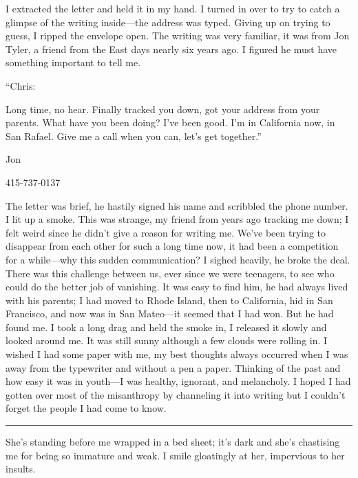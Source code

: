 I extracted the letter and held it in my hand. I turned in over to try
to catch a glimpse of the writing inside---the address was typed. Giving
up on trying to guess, I ripped the envelope open. The writing was very
familiar, it was from Jon Tyler, a friend from the East days nearly six
years ago. I figured he must have something important to tell me.

``Chris:

Long time, no hear. Finally tracked you down, got your address from your
parents. What have you been doing? I've been good. I'm in California
now, in San Rafael. Give me a call when you can, let's get together.''

Jon

415-737-0137

The letter was brief, he hastily signed his name and scribbled the phone
number. I lit up a smoke. This was strange, my friend from years ago
tracking me down; I felt weird since he didn't give a reason for writing
me. We've been trying to disappear from each other for such a long time
now, it had been a competition for a while---why this sudden
communication? I sighed heavily, he broke the deal. There was this
challenge between us, ever since we were teenagers, to see who could do
the better job of vanishing. It was easy to find him, he had always
lived with his parents; I had moved to Rhode Island, then to California,
hid in San Francisco, and now was in San Mateo---it seemed that I had
won. But he had found me. I took a long drag and held the smoke in, I
released it slowly and looked around me. It was still sunny although a
few clouds were rolling in. I wished I had some paper with me, my best
thoughts always occurred when I was away from the typewriter and without
a pen a paper. Thinking of the past and how easy it was in youth---I was
healthy, ignorant, and melancholy. I hoped I had gotten over most of the
misanthropy by channeling it into writing but I couldn't forget the
people I had come to know.

\begin{center}\rule{0.5\linewidth}{0.5pt}\end{center}

She's standing before me wrapped in a bed sheet; it's dark and she's
chastising me for being so immature and weak. I smile gloatingly at her,
impervious to her insults.

